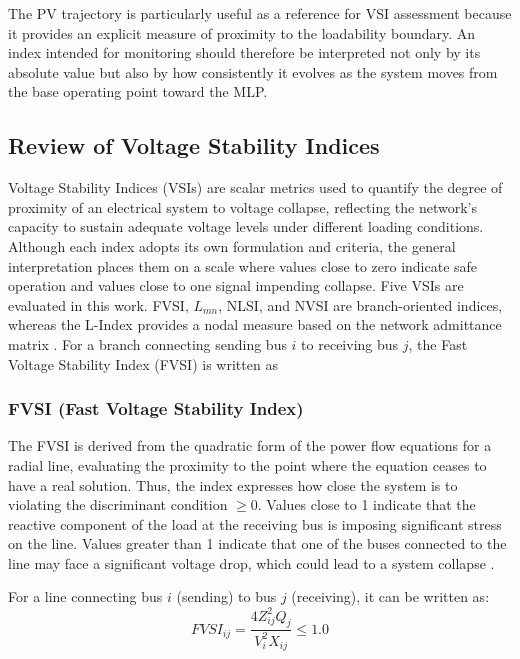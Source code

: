 \documentclass[conference]{IEEEtran}
\begin{document}
The PV trajectory is particularly useful as a reference for VSI assessment because it provides an explicit measure of proximity to the loadability boundary. An index intended for monitoring should therefore be interpreted not only by its absolute value but also by how consistently it evolves as the system moves from the base operating point toward the MLP.

\subsection{Review of Voltage Stability Indices}

Voltage Stability Indices (VSIs) are scalar metrics used to quantify the degree of proximity of an electrical system to voltage collapse, reflecting the network's capacity to sustain adequate voltage levels under different loading conditions. Although each index adopts its own formulation and criteria, the general interpretation places them on a scale where values close to zero indicate safe operation and values close to one signal impending collapse. Five VSIs are evaluated in this work. FVSI, $L_{mn}$, NLSI, and NVSI are branch-oriented indices, whereas the L-Index provides a nodal measure based on the network admittance matrix \cite{modarresi2016comprehensive}. For a branch connecting sending bus $i$ to receiving bus $j$, the Fast Voltage Stability Index (FVSI) is written as \cite{musirin2002}

\subsubsection{FVSI (Fast Voltage Stability Index)}
The FVSI is derived from the quadratic form of the power flow equations for a radial line, evaluating the proximity to the point where the equation ceases to have a real solution. Thus, the index expresses how close the system is to violating the discriminant condition $\geq 0$. Values close to 1 indicate that the reactive component of the load at the receiving bus is imposing significant stress on the line. Values greater than 1 indicate that one of the buses connected to the line may face a significant voltage drop, which could lead to a system collapse \cite{musirin2002}. 

For a line connecting bus $i$ (sending) to bus $j$ (receiving), it can be written as:
\begin{equation}
FVSI_{ij} = \frac{4 Z_{ij}^2 Q_j}{V_i^2 X_{ij}} \le 1.0
\end{equation}
\end{document}
